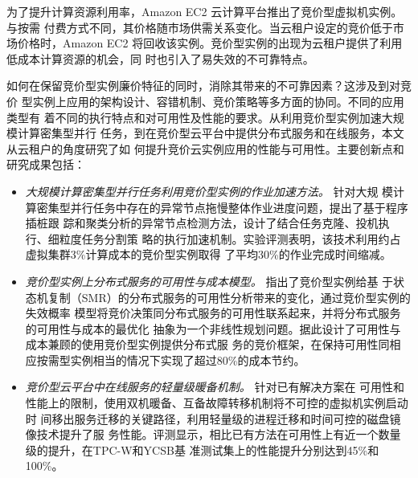 \begin{cabstract}
  为了提升计算资源利用率，Amazon EC2 云计算平台推出了竞价型虚拟机实例。与按需
  付费方式不同，其价格随市场供需关系变化。当云租户设定的竞价低于市场价格时，Amazon 
  EC2 将回收该实例。竞价型实例的出现为云租户提供了利用低成本计算资源的机会，同
  时也引入了易失效的不可靠特点。

  如何在保留竞价型实例廉价特征的同时，消除其带来的不可靠因素？这涉及到对竞价
  型实例上应用的架构设计、容错机制、竞价策略等多方面的协同。不同的应用类型有
  着不同的执行特点和对可用性及性能的要求。从利用竞价型实例加速大规模计算密集型并行
  任务，到在竞价型云平台中提供分布式服务和在线服务，本文从云租户的角度研究了如
  何提升竞价云实例应用的性能与可用性。主要创新点和研究成果包括：
  \begin{itemize}
    \item \emph{大规模计算密集型并行任务利用竞价型实例的作业加速方法。} 针对大规
    模计算密集型并行任务中存在的异常节点拖慢整体作业进度问题，提出了基于程序插桩跟
    踪和聚类分析的异常节点检测方法，设计了结合任务克隆、投机执行、细粒度任务分割策
    略的执行加速机制。实验评测表明，该技术利用约占虚拟集群3\%计算成本的竞价型实例取得
    了平均30\%的作业完成时间缩减。
    \item \emph{竞价型实例上分布式服务的可用性与成本模型。} 指出了竞价型实例给基
    于状态机复制（SMR）的分布式服务的可用性分析带来的变化，通过竞价型实例的失效概率
    模型将竞价决策同分布式服务的可用性联系起来，并将分布式服务的可用性与成本的最优化
    抽象为一个非线性规划问题。据此设计了可用性与成本兼顾的使用竞价型实例提供分布式服
    务的竞价框架，在保持可用性同相应按需型实例相当的情况下实现了超过80\%的成本节约。
    \item \emph{竞价型云平台中在线服务的轻量级暖备机制。} 针对已有解决方案在
    可用性和性能上的限制，使用双机暖备、互备故障转移机制将不可控的虚拟机实例启动时
    间移出服务迁移的关键路径，利用轻量级的进程迁移和时间可控的磁盘镜像技术提升了服
    务性能。评测显示，相比已有方法在可用性上有近一个数量级的提升，在TPC-W和YCSB基
    准测试集上的性能提升分别达到45\%和100\%。
  \end{itemize}

\end{cabstract}


